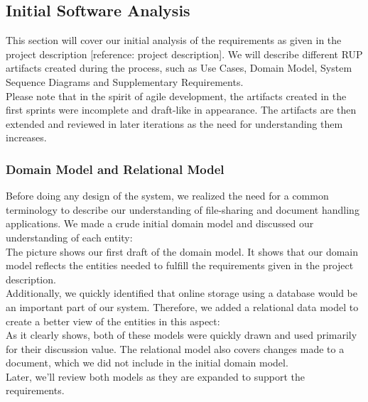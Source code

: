 \subsection{Initial Software Analysis}
This section will cover our initial analysis of the requirements as given in the project description [reference: project description]. We will describe different RUP artifacts created during the process, such as Use Cases, Domain Model, System Sequence Diagrams and Supplementary Requirements.\\
Please note that in the spirit of agile development, the artifacts created in the first sprints were incomplete and draft-like in appearance. The artifacts are then extended and reviewed in later iterations as the need for understanding them increases.\\
\subsubsection{Domain Model and Relational Model}
Before doing any design of the system, we realized the need for a common terminology to describe our understanding of file-sharing and document handling applications. We made a crude initial domain model and discussed our understanding of each entity:\\
\newline
The picture shows our first draft of the domain model. It shows that our domain model reflects the entities needed to fulfill the requirements given in the project description.\\
Additionally, we quickly identified that online storage using a database would be an important part of our system. Therefore, we added a relational data model to create a better view of the entities in this aspect:\\
As it clearly shows, both of these models were quickly drawn and used primarily for their discussion value. The relational model also covers changes made to a document, which we did not include in the initial domain model.\\
Later, we’ll review both models as they are expanded to support the requirements.\\
